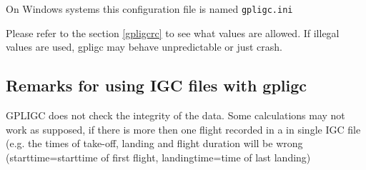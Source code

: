 On Windows systems this configuration file is named \texttt{gpligc.ini}

Please refer to the section \ref{gpligcrc} to see what values are allowed.
If illegal values are used, gpligc may behave unpredictable or just crash.



\subsection{Remarks for using IGC files with gpligc}
GPLIGC does not check the integrity of the data.
Some calculations may not work as supposed, if there is more then one flight recorded in a in single IGC file
(e.g. the times of take-off, landing and flight duration will be wrong (starttime=starttime of first flight, landingtime=time of last landing)
